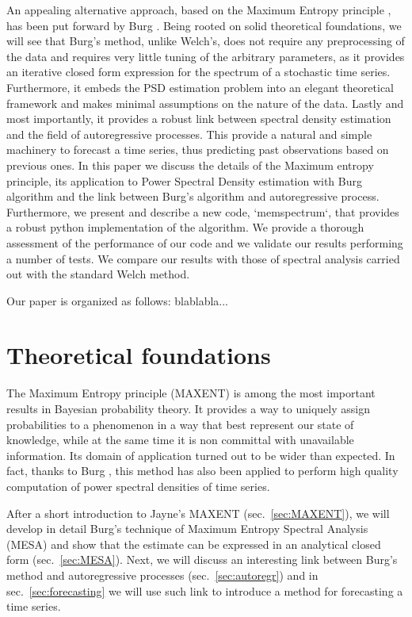 \documentclass[twocolumn,showpacs,preprintnumbers,nofootinbib,prd,
superscriptaddress,10pt]{revtex4-1}
\begin{document}
\par
An appealing alternative approach, based on the Maximum Entropy principle \cite{Jaynes}, has been put forward by Burg \cite{burg1975maximum}. Being rooted on solid theoretical foundations, we will see that Burg's method, unlike Welch's, does not require any preprocessing of the data and requires very little tuning of the arbitrary parameters, as it provides an iterative closed form expression for the spectrum of a stochastic time series. Furthermore, it embeds the PSD estimation problem into an elegant theoretical framework and makes minimal assumptions on the nature of the data.
Lastly and most importantly, it provides a robust link between spectral density estimation and the field of autoregressive processes. This provide a natural and simple machinery to forecast a time series, thus predicting past observations based on previous ones.
In this paper we discuss the details of the Maximum entropy principle, its application to Power Spectral Density estimation with Burg algorithm and the link between Burg's algorithm and autoregressive process. Furthermore, we present and describe a new code, `memspectrum`, that provides a robust python implementation of the algorithm.
We provide a thorough assessment of the performance of our code and we validate our results performing a number of tests. We compare our results with those of spectral analysis carried out with the standard Welch method.
\par
Our paper is organized as follows: blablabla...


\section{Theoretical foundations}
The Maximum Entropy principle (MAXENT) is among the most important results in Bayesian probability theory. It provides a way to uniquely assign probabilities to a phenomenon in a way that best represent our state of knowledge, while at the same time it is non committal with unavailable information. Its domain of application turned out to be wider than expected. In fact, thanks to Burg \cite{burg1975maximum}, this method has also been applied to perform high quality computation of power spectral densities of time series.

After a short introduction to Jayne's MAXENT (sec.~\ref{sec:MAXENT}), we will develop in detail Burg's technique of Maximum Entropy Spectral Analysis (MESA) and show that the estimate can be expressed in an analytical closed form (sec.~\ref{sec:MESA}).
Next, we will discuss an interesting link between Burg's method and autoregressive processes (sec.~\ref{sec:autoregr}) and in sec.~\ref{sec:forecasting} we will use such link to introduce a method for forecasting a time series.
\end{document}
